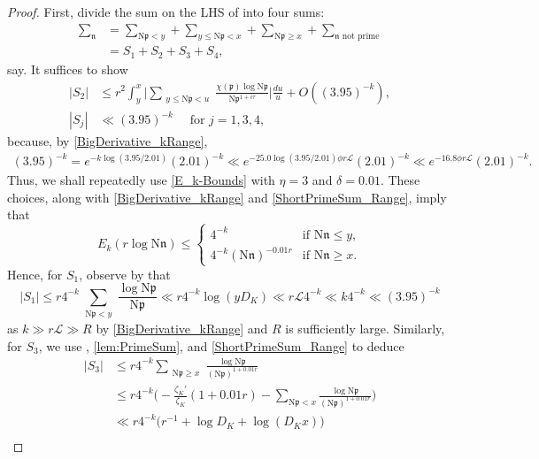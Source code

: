 \documentclass[12pt,psamsfonts]{amsart}
\theoremstyle{definition}
\theoremstyle{remark}
\numberwithin{equation}{section}
\theoremstyle{plain}
\theoremstyle{remark}
\renewcommand{\1}{ {\bf 1}}
\newcommand{\cL}{\mathcal{L}}
\newcommand{\kn}{\mathfrak{n}}
\newcommand{\N}{\mathrm{N}}
\newcommand{\kp}{\mathfrak{p}}
\begin{document}
\begin{proof} First, divide the sum on the LHS of into four sums:
\begin{align*}
\sum_{\kn} & = \sum_{\N\kp < y} + \sum_{y \leq \N\kp < x} + \sum_{\N\kp \geq x} + \sum_{\kn \text{ not prime} }  \\
& = S_1 + S_2 + S_3 + S_4,
\end{align*}
say. It suffices to show
\begin{align*}
|S_2| & \leq r^2 \int_y^x \Big| \sum_{\substack{y \leq \N\kp < u}} \frac{\chi(\kp) \log \N \kp  }{\N\kp^{1+i\tau}}  \Big| \frac{du}{u}  + O( (3.95)^{-k}), \\
|S_j| &  \ll (3.95)^{-k} \quad \text{ for $j=1,3,4,$}
\end{align*}
because, by \eqref{BigDerivative_kRange},
\begin{align*}
(3.95)^{-k} = e^{-k \log( 3.95/2.01)} (2.01)^{-k} \ll  e^{- 25.0 \log(3.95/2.01) \phi r \cL} (2.01)^{-k} \ll e^{-16.8 \phi r \cL} (2.01)^{-k}.
\end{align*}
Thus, we shall repeatedly use \eqref{E_k-Bounds} with $\eta = 3$ and $\delta = 0.01$. These choices, along with \eqref{BigDerivative_kRange} and \eqref{ShortPrimeSum_Range}, imply that 
\begin{equation}
E_k(r \log \N\kn)  \leq
\begin{cases}
4^{-k} & \text{if $\N\kn \leq y$}, \\
4^{-k} (\N\kn)^{-0.01 r} & \text{if $\N\kn \geq x$}.
\end{cases}
\label{E_k-Bounds_Simple}
\end{equation}
Hence, for $S_1$, observe by \cite[Lemma 1.11]{Weiss} that
\[
|S_1| \leq  r 4^{-k} \sum_{\substack{\N\kp < y}} \frac{\log \N\kp }{\N\kp}  \ll r 4^{-k}  \log( y D_K) \ll  r\cL 4^{-k} \ll k 4^{-k} \ll (3.95)^{-k}
\]
as $k \gg r\cL \gg R$ by \eqref{BigDerivative_kRange} and $R$ is sufficiently large. Similarly, for $S_3$, we use \cite[Lemma 1.11]{Weiss}, \cref{lem:PrimeSum}, and \eqref{ShortPrimeSum_Range} to deduce \\
\begin{equation*}
\begin{aligned}
|S_3| & \leq  r4^{-k} \sum_{\substack{\N\kp \geq x}} \frac{\log \N\kp}{(\N\kp)^{1+ 0.01 r}}  \\
& \leq r 4^{-k} \Big( -\frac{\zeta_K'}{\zeta_K}(1+0.01 r) - \sum_{\N\kp < x} \frac{\log \N\kp}{(\N\kp)^{1+0.01 r} } \Big) \\
& \ll r 4^{-k} \Big( r^{-1}+ \log D_K + \log(D_K x) \Big)    \\

\end{aligned}
\end{equation*}
\end{proof}
\end{document}
